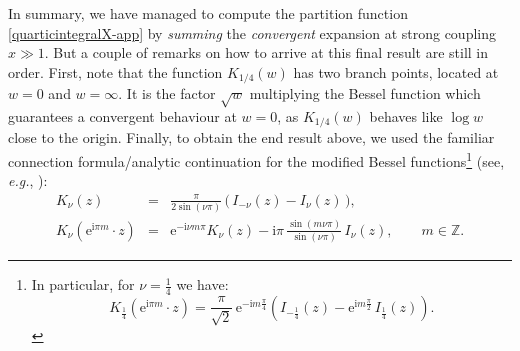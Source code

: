 \documentclass[11pt,a4paper]{article}
\newcommand{\rme}{{\mathrm{e}}}
\newcommand{\rmi}{{\mathrm{i}}}
\begin{document}
In summary, we have managed to compute the partition function \eqref{quarticintegralX-app} by \textit{summing} the \textit{convergent} expansion at strong coupling $x\gg1$. But a couple of remarks on how to arrive at this final result are still in order. First, note that the function $K_{1/4} (w)$ has two branch points, located at $w=0$ and $w=\infty$. It is the factor $\sqrt{w}$ multiplying the Bessel function which guarantees a convergent behaviour at $w=0$, as $K_{1/4}(w)$ behaves like $\log w$ close to the origin. Finally, to obtain the end result above, we used the familiar connection formula/analytic continuation for the modified Bessel functions\footnote{In particular, for $\nu=\frac{1}{4}$ we have: 
%
\begin{equation}
K_{\frac{1}{4}} \left( \rme^{\rmi\pi m} \cdot z \right) = \frac{\pi}{\sqrt{2}}\, \rme^{ - \rmi m \frac{\pi}{4}} \left( I_{-\frac{1}{4}} (z) - \rme^{\rmi m \frac{\pi}{2}}\, I_{\frac{1}{4}} (z) \right).
\end{equation}
} (see, \textit{e.g.}, \cite{olbc10}):
%
\begin{eqnarray}
K_{\nu} (z) &=& \frac{\pi}{2 \sin (\nu\pi)}\, \Big(\, I_{-\nu} (z) - I_{\nu} (z)\, \Big), \\
K_{\nu}\left( \rme^{\rmi\pi m} \cdot z \right) &=& \rme^{-\rmi\nu m\pi} K_{\nu} (z) - \rmi\pi\, \frac{\sin (m\nu\pi)}{\sin (\nu\pi)}\, I_{\nu} (z), \qquad m\in\mathbb{Z}.
\end{eqnarray}
\end{document}
